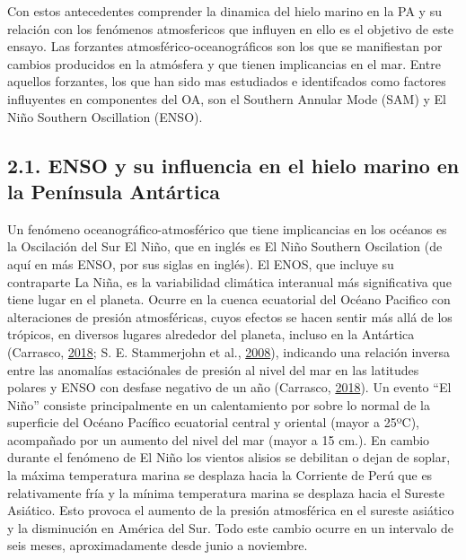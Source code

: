 \documentclass[
]{article}
\begin{document}
Con estos antecedentes comprender la dinamica del hielo marino en la PA
y su relación con los fenómenos atmosfericos que influyen en ello es el
objetivo de este ensayo. Las forzantes atmosférico-oceanográficos son
los que se manifiestan por cambios producidos en la atmósfera y que
tienen implicancias en el mar. Entre aquellos forzantes, los que han
sido mas estudiados e identifcados como factores influyentes en
componentes del OA, son el Southern Annular Mode (SAM) y El Niño
Southern Oscillation (ENSO).

\hypertarget{enso-y-su-influencia-en-el-hielo-marino-en-la-penuxednsula-antuxe1rtica}{%
\subsection{2.1. ENSO y su influencia en el hielo marino en la Península
Antártica}\label{enso-y-su-influencia-en-el-hielo-marino-en-la-penuxednsula-antuxe1rtica}}

Un fenómeno oceanográfico-atmosférico que tiene implicancias en los
océanos es la Oscilación del Sur El Niño, que en inglés es El Niño
Southern Oscilation (de aquí en más ENSO, por sus siglas en inglés). El
ENOS, que incluye su contraparte La Niña, es la variabilidad climática
interanual más significativa que tiene lugar en el planeta. Ocurre en la
cuenca ecuatorial del Océano Pacifico con alteraciones de presión
atmosféricas, cuyos efectos se hacen sentir más allá de los trópicos, en
diversos lugares alrededor del planeta, incluso en la Antártica
(Carrasco, \protect\hyperlink{ref-Carrasco2018}{2018}; S. E. Stammerjohn
et al., \protect\hyperlink{ref-Stammerjohn2008}{2008}), indicando una
relación inversa entre las anomalías estaciónales de presión al nivel
del mar en las latitudes polares y ENSO con desfase negativo de un año
(Carrasco, \protect\hyperlink{ref-Carrasco2018}{2018}). Un evento ``El
Niño'' consiste principalmente en un calentamiento por sobre lo normal
de la superficie del Océano Pacífico ecuatorial central y oriental
(mayor a 25ºC), acompañado por un aumento del nivel del mar (mayor a 15
cm.). En cambio durante el fenómeno de El Niño los vientos alisios se
debilitan o dejan de soplar, la máxima temperatura marina se desplaza
hacia la Corriente de Perú que es relativamente fría y la mínima
temperatura marina se desplaza hacia el Sureste Asiático. Esto provoca
el aumento de la presión atmosférica en el sureste asiático y la
disminución en América del Sur. Todo este cambio ocurre en un intervalo
de seis meses, aproximadamente desde junio a noviembre.
\end{document}
